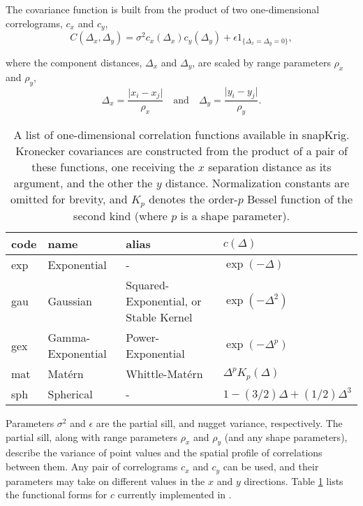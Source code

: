 The covariance function is built from the product of two one-dimensional correlograms, \(c_x\) and \(c_y\),
\begin{equation}
C \left( \Delta_x, \Delta_y \right) = \sigma^2 c_x \left( \Delta_x \right) c_y \left( \Delta_y \right) + \epsilon 1_{ \{ \Delta_x = \Delta_y = 0 \}},
\label{eq:covfun}
\end{equation}

where the component distances, \(\Delta_x\) and \(\Delta_y\), are scaled by range parameters \(\rho_x\) and \(\rho_y\),
\begin{equation}
\Delta_x = \frac{ \lvert x_i - x_j \rvert }{ \rho_x } \quad \text{and} \quad \Delta_y = \frac{ \lvert y_i - y_j \rvert }{ \rho_y }. \label{eq:dfun}
\end{equation}

\begin{table}

\caption{\label{tab:cfun-table-latex}A list of one-dimensional correlation functions available in snapKrig. Kronecker covariances are constructed from the product of a pair of these functions, one receiving the $x$ separation distance as its argument, and the other the $y$ distance. Normalization constants are omitted for brevity, and $K_p$ denotes the order-$p$ Bessel function of the second kind (where $p$ is a shape parameter).}
\centering
\fontsize{9}{11}\selectfont
\begin{tabular}[t]{llll}
\toprule
code & name & alias & $c\left( \Delta \right)$\\
\midrule
exp & Exponential & - & $\exp\left( -\Delta \right)$\\
gau & Gaussian & Squared-Exponential, or Stable Kernel & $\exp\left( -\Delta^2 \right)$\\
gex & Gamma-Exponential & Power-Exponential & $\exp\left( -\Delta^p \right)$\\
mat & Mat\'ern & Whittle-Mat\'ern & $\Delta^p K_p\left( \Delta \right)$\\
sph & Spherical & - & $1 - (3/2)\Delta + (1/2)\Delta^3$\\
\bottomrule
\end{tabular}
\end{table}

Parameters \(\sigma^2\) and \(\epsilon\) are the partial sill, and nugget variance, respectively. The partial sill, along with range parameters \(\rho_x\) and \(\rho_y\) (and any shape parameters), describe the variance of point values and the spatial profile of correlations between them. Any pair of correlograms \(c_x\) and \(c_y\) can be used, and their parameters may take on different values in the \(x\) and \(y\) directions.
Table \ref{tab:cfun-table-latex}
lists the functional forms for \(c\) currently implemented in .

